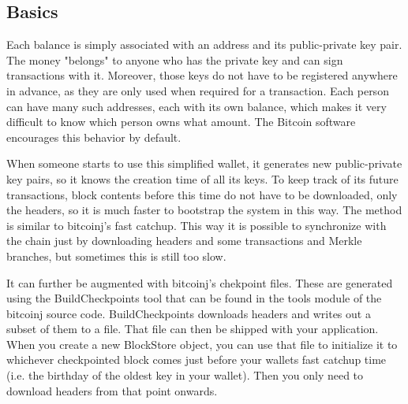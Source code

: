 \documentclass[a4paper,12pt]{article}
\begin{document}
\subsection{Basics}
Each balance is simply associated with an address and its public-private key pair. The money "belongs" to anyone who has the private key and can sign transactions with it. Moreover, those keys do not have to be registered anywhere in advance, as they are only used when required for a transaction. Each person can have many such addresses, each with its own balance, which makes it very difficult to know which person owns what amount. The Bitcoin software encourages this behavior by default.

When someone starts to use this simplified wallet, it generates new public-private key pairs, so it knows the creation time of all its keys. To keep track of its future transactions, block contents before this time do not have to be downloaded, only the headers, so it is much faster to bootstrap the system in this way. The method is similar to bitcoinj's fast catchup. This way it is possible to synchronize with the chain just by downloading headers and some transactions and Merkle branches, but sometimes this is still too slow. 

It can further be augmented with bitcoinj's chekpoint files. These are generated using the BuildCheckpoints tool that can be found in the tools module of the bitcoinj source code. BuildCheckpoints downloads headers and writes out a subset of them to a file. That file can then be shipped with your application. When you create a new BlockStore object, you can use that file to initialize it to whichever checkpointed block comes just before your wallets fast catchup time (i.e. the birthday of the oldest key in your wallet). Then you only need to download headers from that point onwards.

\end{document}
